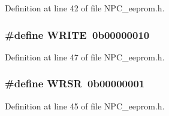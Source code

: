 Definition at line 42 of file N\+P\+C\+\_\+eeprom.\+h.

\subsubsection[{\texorpdfstring{W\+R\+I\+TE}{WRITE}}]{\setlength{\rightskip}{0pt plus 5cm}\#define W\+R\+I\+TE~0b00000010}\hypertarget{group___instructions_gaa10f470e996d0f51210d24f442d25e1e}{}\label{group___instructions_gaa10f470e996d0f51210d24f442d25e1e}


Definition at line 47 of file N\+P\+C\+\_\+eeprom.\+h.

\subsubsection[{\texorpdfstring{W\+R\+SR}{WRSR}}]{\setlength{\rightskip}{0pt plus 5cm}\#define W\+R\+SR~0b00000001}\hypertarget{group___instructions_ga29d01dca16eb0a060d2efd567b58b47a}{}\label{group___instructions_ga29d01dca16eb0a060d2efd567b58b47a}


Definition at line 45 of file N\+P\+C\+\_\+eeprom.\+h.

